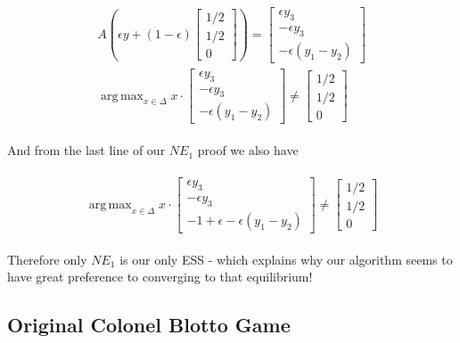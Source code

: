\documentclass [11pt]{article}
\DeclareMathOperator*{\argmax}{arg\,max}
\begin{document}
\begin{align}
  \begin{split}
    A (\epsilon y + (1 - \epsilon)
    \begin{bmatrix}
      1/2 \\
      1/2 \\
      0
    \end{bmatrix}
      ) =
    \begin{bmatrix}
      \epsilon y_3 \\
      -\epsilon y_3 \\
      - \epsilon (y_1 - y_2)
    \end{bmatrix} \\
    \argmax_{x \in \Delta} x \cdot
    \begin{bmatrix}
      \epsilon y_3 \\
      -\epsilon y_3 \\
      - \epsilon (y_1 - y_2)
    \end{bmatrix}
    \neq
    \begin{bmatrix}
      1/2 \\
      1/2 \\
      0
    \end{bmatrix}
  \end{split}
\end{align}

And from the last line of our $NE_1$ proof we also have

\begin{align}
  \begin{split}
    \argmax_{x \in \Delta} x \cdot
    \begin{bmatrix}
      \epsilon y_3 \\
      -\epsilon y_3 \\
      - 1 + \epsilon - \epsilon (y_1 - y_2)
    \end{bmatrix}
    \neq
    \begin{bmatrix}
      1/2 \\
      1/2 \\
      0
    \end{bmatrix}
  \end{split}
\end{align}

Therefore only $NE_1$ is our only ESS - which explains why our algorithm seems to have great preference to converging to that equilibrium!

\subsection{Original Colonel Blotto Game}
\end{document}
